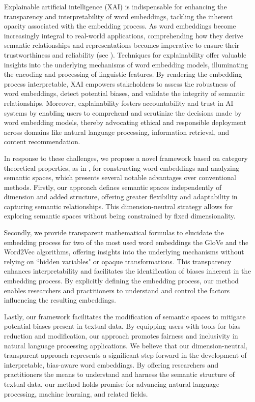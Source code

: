 \documentclass[10pt,a4paper]{elsarticle}
\begin{document}
Explainable artificial intelligence (XAI) is indispensable for enhancing the transparency and interpretability of word embeddings, tackling the inherent opacity associated with the embedding process. As word embeddings become increasingly integral to real-world applications, comprehending how they derive semantic relationships and representations becomes imperative to ensure their trustworthiness and reliability (see \cite{Survey}). Techniques for explainability offer valuable insights into the underlying mechanisms of word embedding models, illuminating the encoding and processing of linguistic features. By rendering the embedding process interpretable, XAI empowers stakeholders to assess the robustness of word embeddings, detect potential biases, and validate the integrity of semantic relationships. Moreover, explainability fosters accountability and trust in AI systems by enabling users to comprehend and scrutinize the decisions made by word embedding models, thereby advocating ethical and responsible deployment across domains like natural language processing, information retrieval, and content recommendation.

In response to these challenges, we propose a novel framework based on category theoretical properties, as in \citep{CatSem,BPF}, for constructing word embeddings and analyzing semantic spaces, which presents several notable advantages over conventional methods. Firstly, our approach defines semantic spaces independently of dimension and added structure, offering greater flexibility and adaptability in capturing semantic relationships. This dimension-neutral strategy allows for exploring semantic spaces without being constrained by fixed dimensionality.

Secondly, we provide transparent mathematical formulas to elucidate the embedding process for two of the most used word embeddings the GloVe \cite{pennington2014glove} and the Word2Vec \cite{Mikolov2013EfficientEO} algorithms, offering insights into the underlying mechanisms without relying on ``hidden variables" or opaque transformations. This transparency enhances interpretability and facilitates the identification of biases inherent in the embedding process. By explicitly defining the embedding process, our method enables researchers and practitioners to understand and control the factors influencing the resulting embeddings.

Lastly, our framework facilitates the modification of semantic spaces to mitigate potential biases present in textual data. By equipping users with tools for bias reduction and modification, our approach promotes fairness and inclusivity in natural language processing applications. We believe that our dimension-neutral, transparent approach represents a significant step forward in the development of interpretable, bias-aware word embeddings. By offering researchers and practitioners the means to understand and harness the semantic structure of textual data, our method holds promise for advancing natural language processing, machine learning, and related fields.
\end{document}
